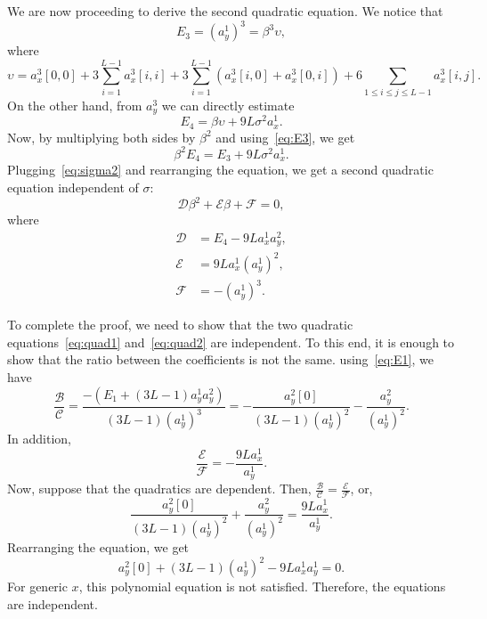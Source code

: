 \documentclass[english,11pt]{article}
\newcommand{\TODO}[1]{{\color{red}{[#1]}}}
\numberwithin{equation}{section}
\theoremstyle{plain}
\theoremstyle{definition}
\theoremstyle{remark}
\theoremstyle{plain}
\theoremstyle{remark}
\theoremstyle{plain}
\theoremstyle{plain}
\begin{document}
We are now proceeding to derive the second quadratic equation. We notice that \begin{equation} \label{eq:E3}
E_3  = (a_y^1)^3 = \beta^3 \upsilon,
\end{equation}
where \TODO{to check} $$\upsilon = a_x^3[0,0] + 3\sum_{i=1}^{L-1}a_x^3[i,i] + 3\sum_{i=1}^{L-1}(a_x^3[i,0]+a_x^3[0,i]) + 6\sum_{1\leq i \leq j\leq L-1}a_x^3[i,j].$$
On the other hand, from $a_y^3$ we can directly estimate
\begin{equation} \label{eq:E4}
E_4 = \beta\upsilon + 9L\sigma^2a_x^1.
\end{equation}
Now, by multiplying both sides by $\beta^2$ and using~\eqref{eq:E3}, we get 
\begin{equation} \label{eq:E4}
\beta^2E_4 =  E_3  + 9L\sigma^2a_x^1.
\end{equation}
Plugging~\eqref{eq:sigma2} and rearranging the equation, we get a second quadratic equation independent of $\sigma$:
\begin{equation} \label{eq:quad2}
\mathcal{D}\beta^2 + \mathcal{E}\beta + \mathcal{F} = 0,
\end{equation}
where
\begin{align*}
\mathcal{D} &= E_4 - 9La_x^1a_y^2, \\ 
\mathcal{E} &= 9La_x^1(a_y^1)^2, \\
\mathcal{F} &= -(a_y^1)^3.
\end{align*}

To complete the proof, we need to show that the two quadratic equations~\eqref{eq:quad1} and~\eqref{eq:quad2} are independent. To this end, it is enough to show that the ratio between the coefficients is not the same. 
using~\eqref{eq:E1}, we have 
\begin{equation*}
\frac{\mathcal{B}}{\mathcal{C}} = \frac{-(E_1 + (3L-1)a_y^1a_y^2)}{(3L-1)(a_y^1)^3} = -\frac{a_y^2[0]}{(3L-1)(a_y^1)^2} - \frac{a_y^2}{(a_y^1)^2}.
\end{equation*}
In addition, 
\begin{equation*}
\frac{\mathcal{E}}{\mathcal{F}} = -\frac{9La_x^1}{a_y^1}. 
\end{equation*}
Now, suppose that the quadratics are dependent. Then, $\frac{\mathcal{B}}{\mathcal{C}} =\frac{\mathcal{E}}{\mathcal{F}} $, or, 	
\begin{equation*}
\frac{a_y^2[0]}{(3L-1)(a_y^1)^2} + \frac{a_y^2}{(a_y^1)^2} = \frac{9La_x^1}{a_y^1}. 
\end{equation*}
Rearranging the equation, we get 
\begin{equation*}
 a_y^2[0] + (3L-1)(a_y^1)^2 - 9La_x^1a_y^1=0.
\end{equation*}	
For generic $x$,  this polynomial equation is not satisfied. Therefore,  the equations are independent. 
\end{document}
